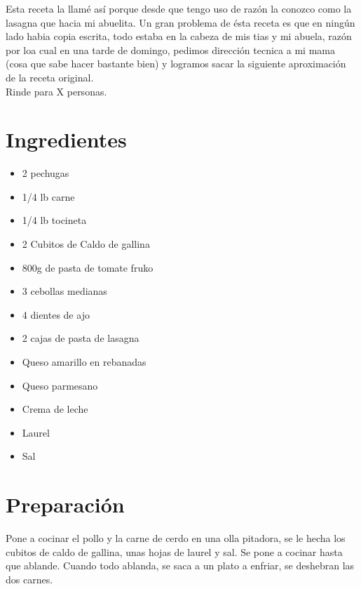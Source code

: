 Esta receta la llamé así porque desde que tengo uso de razón la conozco como la lasagna que hacia mi abuelita. Un gran problema de ésta receta es que en ningún lado habia copia escrita, todo estaba en la cabeza de mis tias y mi abuela, razón por loa cual en una tarde de domingo, pedimos dirección tecnica a mi mama (cosa que sabe hacer bastante bien) y logramos sacar la siguiente aproximación de la receta original. \\

Rinde para X personas.


\section*{Ingredientes}
\begin{itemize}
\setlength{\itemsep}{0pt}
\setlength{\parsep}{0pt} \setlength{\parskip}{0pt}
\item 2 pechugas
\item 1/4 lb carne
\item 1/4 lb tocineta
\item 2 Cubitos de Caldo de gallina
\item 800g de pasta de tomate fruko
\item 3 cebollas medianas
\item 4 dientes de ajo
\item 2 cajas de pasta de lasagna
\item Queso amarillo en rebanadas
\item Queso parmesano
\item Crema de leche
\item Laurel
\item Sal
\end{itemize}
\section*{Preparación}
Pone a cocinar el pollo y la carne de cerdo en una olla pitadora, se le hecha los cubitos de caldo de gallina, unas hojas de laurel y sal. Se pone a cocinar hasta que ablande. Cuando todo ablanda, se saca a un plato a enfriar, se deshebran las dos carnes.\\


